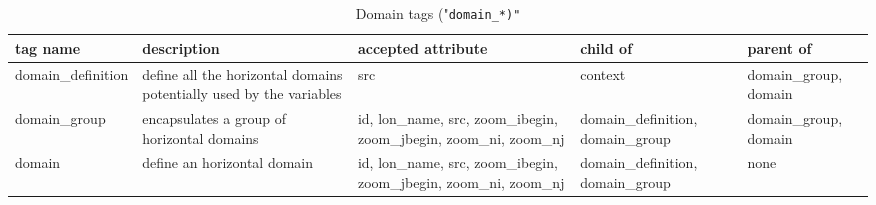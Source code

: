 \documentclass[../main/NEMO_manual]{subfiles}
\begin{document}
\begin{table}
  \scriptsize
  \begin{tabularx}{\textwidth}{|l|X|X|X|X|}
    \hline
    tag name                                                            &
    description                                                         &
    accepted attribute                                                  &
    child of                                                            &
    parent of               \\
    \hline
    \hline
    domain\_\-definition                                                &
    define all the horizontal domains potentially used by the variables &
    src                                                                 &
    context                                                             &
    domain\_\-group, domain \\
    \hline
    domain\_group                                                       &
    encapsulates a group of horizontal domains                          &
    id, lon\_name, src, zoom\_ibegin, zoom\_jbegin, zoom\_ni, zoom\_nj  &
    domain\_\-definition, domain\_group                                 &
    domain\_\-group, domain \\
    \hline
    domain                                                              &
    define an horizontal domain                                         &
    id, lon\_name, src, zoom\_ibegin, zoom\_jbegin, zoom\_ni, zoom\_nj  &
    domain\_\-definition, domain\_group                                 &
    none                    \\
    \hline
  \end{tabularx}
  \caption{Domain tags ("\tt{domain\_*)}"}
\end{table}
\end{document}
